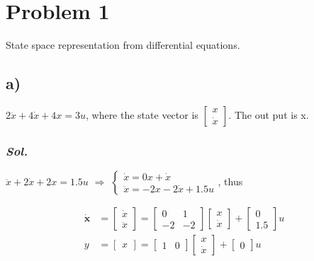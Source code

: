 \section{Problem 1}
    State space representation from differential equations.

    \subsection{a)} 
    $2\ddot{x} + 4\dot{x} + 4x=3u$, where the state vector is 
    $\begin{bmatrix}
        x \\
        \dot{x}
    \end{bmatrix}$.
    The out put is x.
    \subsubsection{\textit{ Sol. }}
    $\ddot{x} + 2\dot{x} + 2x=1.5u$ $\Rightarrow$ 
    $\left\{
        \begin{array}{lr}
        \dot{x} = 0x + \dot{x} \\
        \ddot{x} = -2x -2\dot{x} + 1.5u
        \end{array}
    \right.$, thus

    \begin{align}
        \dot{\textbf{x}} &=
        \begin{bmatrix}
            \dot{x} \\
            \ddot{x}
        \end{bmatrix} = 
        \begin{bmatrix}
            0 & 1 \\
            -2 & -2
        \end{bmatrix}
        \begin{bmatrix}
            x \\
            \dot{x}
        \end{bmatrix} + 
        \begin{bmatrix}
            0\\
            1.5
        \end{bmatrix}
        u
        \\
        y&=
        \begin{bmatrix}
            x
        \end{bmatrix} =
        \begin{bmatrix}
            1 & 0
        \end{bmatrix}
        \begin{bmatrix}
            x \\
            \dot{x}
        \end{bmatrix} + 
        \begin{bmatrix}
            0
        \end{bmatrix}
        u
    \end{align}

